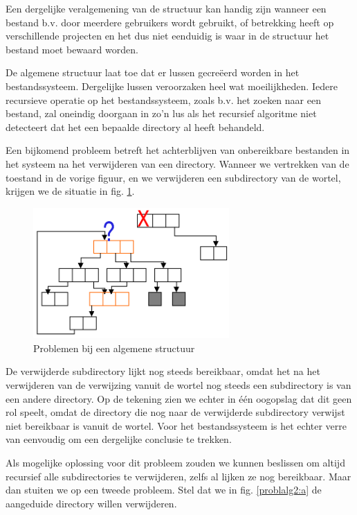 Een dergelijke veralgemening van de structuur kan handig zijn
wanneer een bestand b.v. door meerdere gebruikers wordt gebruikt, of
betrekking heeft op verschillende projecten en het dus niet
eenduidig is waar in de structuur het bestand moet bewaard
worden.

De algemene structuur laat toe dat er lussen gecre\"eerd worden
in het bestandssysteem. Dergelijke lussen veroorzaken heel wat
moeilijkheden. Iedere recursieve operatie op het bestandssysteem,
zoals b.v. het zoeken naar een bestand, zal oneindig doorgaan in
zo'n lus als het recursief algoritme niet detecteert dat het een
bepaalde directory al heeft behandeld.

Een bijkomend probleem betreft het achterblijven van
onbereikbare bestanden in het systeem na het verwijderen van een
directory. Wanneer we vertrekken van de toestand in de vorige
figuur, en we verwijderen een subdirectory van de wortel, krijgen we
de situatie in fig. \ref{problalg1}.

\begin{figure}
\begin{center}
\includegraphics[width=75mm]{images/fig0403.png}
\end{center}
\caption{Problemen bij een algemene structuur}
\label{problalg1}
\end{figure}

De verwijderde subdirectory lijkt nog steeds bereikbaar, omdat
het na het verwijderen van de verwijzing vanuit de wortel nog steeds
een subdirectory is van een andere directory. Op de tekening zien we
echter in \'e\'en oogopslag dat dit geen rol speelt, omdat de directory
die nog naar de verwijderde subdirectory verwijst niet bereikbaar is
vanuit de wortel. Voor het bestandssysteem is het echter verre van
eenvoudig om een dergelijke conclusie te trekken.

Als mogelijke oplossing voor dit probleem zouden we kunnen
beslissen om altijd recursief alle subdirectories te verwijderen,
zelfs al lijken ze nog bereikbaar. Maar dan stuiten we op een tweede
probleem. Stel dat we in fig. \ref{problalg2:a} de aangeduide directory
willen verwijderen.

